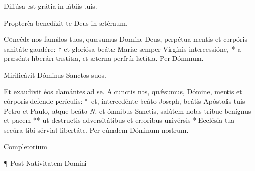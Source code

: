 \documentclass[vesperale_romanum.tex]{subfiles}
\begin{document}
\vv Diffúsa est grátia in lábiis tuis.

\rr Propteréa benedíxit te Deus in ætérnum.

\admagnificat

\label{an_beata_mater_in_sabbato_solesmes_1961}


\oratio \label{oratio_bmv}

\lettrine{C}{o}ncéde nos famúlos tuos, quæsumus Domíne Deus, perpétua mentis et corpóris sanitáte gaudére:~† et gloriósa beátæ Mariæ semper Virgínis intercessióne,~* a præsénti liberári tristítia, et æterna perfrúi lætítia. Per Dóminum.





\vv Mirificávit Dóminus Sanctos suos.

\rr Et exaudivit éos clamántes ad se.
%
\oratio
%
\lettrine{A}{} cunctis nos, quǽsumus, Dómine, mentis et córporis defende perículis: \nolinebreak[4]*~et, intercedénte beáto Joseph, beátis Apóstolis tuis Petro et Paulo, atque beáto \textit{N.} et ómnibus Sanctis, salútem nobis tríbue benígnus et pacem ** ut destructis adversitátibus et erroribus univérsis * Ecclésia tua secúra tibi sérviat libertáte. Per eúmdem Dóminum nostrum.



Completorium  %


¶ Post Nativitatem Domini 
\end{document}
